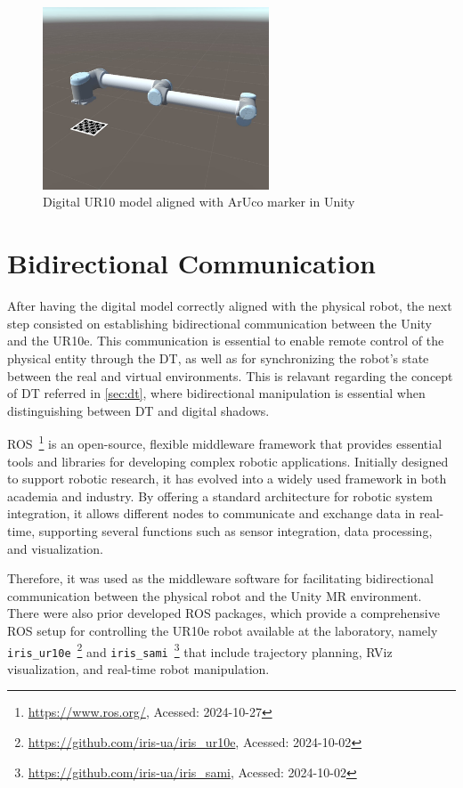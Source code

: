 \begin{figure}[h]
    \centering
    \includegraphics[width=0.6\textwidth]{figs/robot_marker_unity.jpg}
    \caption{Digital UR10 model aligned with ArUco marker in Unity}
    \label{f:ur10_marker_unity}
\end{figure}

\section{Bidirectional Communication}

After having the digital model correctly aligned with the physical robot, the next step consisted on establishing bidirectional communication between the Unity and the UR10e. This communication is essential to enable remote control of the physical entity through the \ac{DT}, as well as for synchronizing the robot's state between the real and virtual environments. This is relavant regarding the concept of \ac{DT} referred in \ref{sec:dt}, where bidirectional manipulation is essential when distinguishing between \ac{DT} and digital shadows. 

\ac{ROS}~\footnote{\url{https://www.ros.org/}, Acessed: 2024-10-27} is an open-source, flexible middleware framework that provides essential tools and libraries for developing complex robotic applications. Initially designed to support robotic research, it has evolved into a widely used framework in both academia and industry. By offering a standard architecture for robotic system integration, it allows different nodes to communicate and exchange data in real-time, supporting several functions such as sensor integration, data processing, and visualization.

Therefore, it was used as the middleware software for facilitating bidirectional communication between the physical robot and the Unity \ac{MR} environment. There were also prior developed \ac{ROS} packages, which provide a comprehensive \ac{ROS} setup for controlling the UR10e robot available at the laboratory, namely \texttt{iris\_ur10e}~\footnote{\url{https://github.com/iris-ua/iris_ur10e}, Acessed: 2024-10-02} and \texttt{iris\_sami}~\footnote{\url{https://github.com/iris-ua/iris_sami}, Acessed: 2024-10-02} that include trajectory planning, RViz visualization, and real-time robot manipulation.
